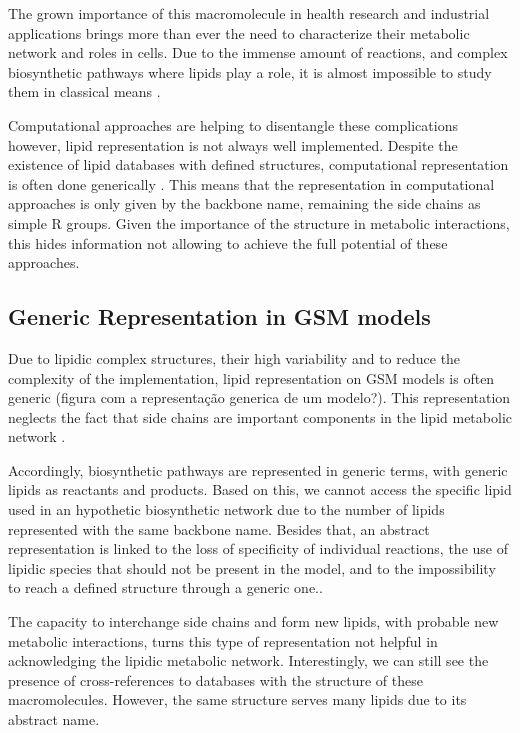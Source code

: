 \documentclass{llncs}
\begin{document}
The grown importance of this macromolecule in health research and industrial applications brings more than ever the need to characterize their metabolic network and roles in cells.
Due to the immense amount of reactions, and complex biosynthetic pathways where lipids play a role, it is almost impossible to study them in classical means \cite{Schutzhold}.

Computational approaches are helping to disentangle these complications however, lipid representation is not always well implemented.
Despite the existence of lipid databases with defined structures, computational representation is often done generically \cite{Aung2013}. 
This means that the representation in computational approaches is only given by the backbone name, remaining the side chains as simple R groups.
Given the importance of the structure in metabolic interactions, this hides information not allowing to achieve the full potential of these approaches.

\subsection{Generic Representation in GSM models}
Due to lipidic complex structures, their high variability and to reduce the complexity of the implementation, lipid representation on GSM models is often generic (figura com a representação generica de um modelo?). 
This representation neglects the fact that side chains are important components in the lipid metabolic network \cite{Fahy2011,Schutzhold}.

Accordingly, biosynthetic pathways are represented in generic terms, with generic lipids as reactants and products.
Based on this, we cannot access the specific lipid used in an hypothetic biosynthetic network due to the number of lipids represented with the same backbone name.
Besides that, an abstract representation is linked to the loss of specificity of individual reactions, the use of lipidic species that should not be present in the model, and to the impossibility to reach a defined structure through a generic one.\cite{Aung2013}.

The capacity to interchange side chains and form new lipids, with probable new metabolic interactions, turns this type of representation not helpful in acknowledging the lipidic metabolic network.
Interestingly, we can still see the presence of cross-references to databases with the structure of these macromolecules. However, the same structure serves many lipids due to its abstract name.
\end{document}
